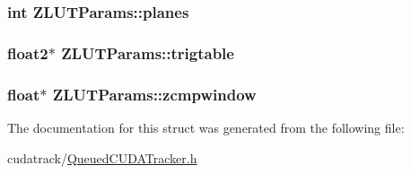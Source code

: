 \subsubsection[{\texorpdfstring{planes}{planes}}]{\setlength{\rightskip}{0pt plus 5cm}int Z\+L\+U\+T\+Params\+::planes}\hypertarget{struct_z_l_u_t_params_ab00dffe1d70415e23bbf989d664495ab}{}\label{struct_z_l_u_t_params_ab00dffe1d70415e23bbf989d664495ab}
\subsubsection[{\texorpdfstring{trigtable}{trigtable}}]{\setlength{\rightskip}{0pt plus 5cm}float2$\ast$ Z\+L\+U\+T\+Params\+::trigtable}\hypertarget{struct_z_l_u_t_params_a18e5051a3a4b118b45854c69977e2dbe}{}\label{struct_z_l_u_t_params_a18e5051a3a4b118b45854c69977e2dbe}
\subsubsection[{\texorpdfstring{zcmpwindow}{zcmpwindow}}]{\setlength{\rightskip}{0pt plus 5cm}float$\ast$ Z\+L\+U\+T\+Params\+::zcmpwindow}\hypertarget{struct_z_l_u_t_params_a5e4fca6a1f41e9dee7ba0614ab4c202d}{}\label{struct_z_l_u_t_params_a5e4fca6a1f41e9dee7ba0614ab4c202d}


The documentation for this struct was generated from the following file\+:\begin{DoxyCompactItemize}
\item 
cudatrack/\hyperlink{_queued_c_u_d_a_tracker_8h}{Queued\+C\+U\+D\+A\+Tracker.\+h}\end{DoxyCompactItemize}
